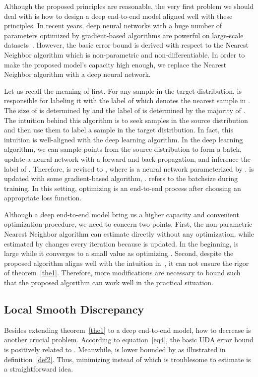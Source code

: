 \documentclass[10pt,twocolumn,letterpaper]{article}
\begin{document}
Although the proposed principles are reasonable, the very first problem we should deal with is how to design a deep end-to-end model aligned well with these principles. In recent years, deep neural networks with a huge number of parameters optimized by gradient-based algorithms are powerful on large-scale datasets~\cite{ben2010theory}. However, the basic error bound is derived with respect to the Nearest Neighbor algorithm which is non-parametric and non-differentiable. In order to make the proposed model's capacity high enough, we replace the Nearest Neighbor algorithm with a deep neural network.

Let us recall the meaning of  first. For any sample  in the target distribution,  is responsible for labeling it with the label of  which denotes the nearest sample in . The size of  is determined by  and the label of  is determined by the majority of . The intuition behind this algorithm is to seek  samples in the source distribution and then use them to label a sample in the target distribution. In fact, this intuition is well-aligned with the deep learning algorithm. In the deep learning algorithm, we can sample  points from the source distribution  to form a batch, update a neural network with a forward and back propagation, and inference the label of . Therefore,  is revised to , where  is a neural network parameterized by .  is updated with some gradient-based algorithm, .  refers to the batchsize during training. In this setting, optimizing  is an end-to-end process after choosing an appropriate loss function.

Although a deep end-to-end model bring us a higher capacity and convenient optimization procedure, we need to concern two points. First, the non-parametric Nearest Neighbor algorithm can estimate  directly without any optimization, while  estimated by  changes every iteration because  is updated. In the beginning,  is large while it converges to a small value as optimizing . Second, despite the proposed algorithm aligns well with the intuition in~\cite{Ben-David2014}, it can not ensure the rigor of theorem~\ref{the1}. Therefore, more modifications are necessary to bound 
 such that the proposed algorithm can work well in the practical situation.

\subsection{Local Smooth Discrepancy}

Besides extending theorem~\ref{the1} to a deep end-to-end model, how to decrease  is another crucial problem. According to equation~\ref{eq4}, the basic UDA error bound is positively related to . Meanwhile,  is lower bounded by  as illustrated in definition~\ref{def2}. Thus, minimizing  instead of  which is troublesome to estimate is a straightforward idea.
\end{document}
